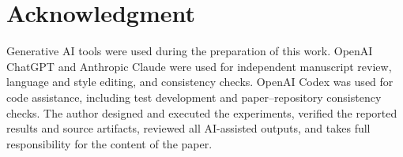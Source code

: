 \documentclass[conference]{IEEEtran}
\begin{document}
\section*{Acknowledgment}

Generative AI tools were used during the preparation of this work. OpenAI ChatGPT and Anthropic Claude were used for independent manuscript review, language and style editing, and consistency checks. OpenAI Codex was used for code assistance, including test development and paper--repository consistency checks. The author designed and executed the experiments, verified the reported results and source artifacts, reviewed all AI-assisted outputs, and takes full responsibility for the content of the paper.

\end{document}
